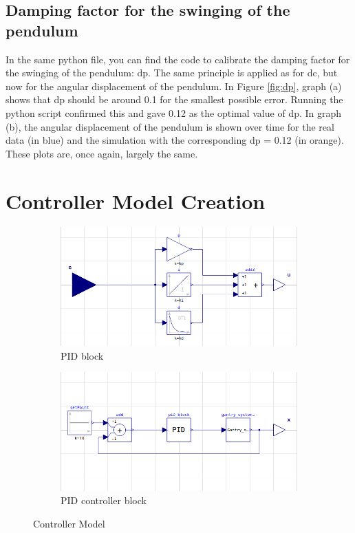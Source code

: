 \documentclass{article}
\begin{document}
\subsection{Damping factor for the swinging of the pendulum}

In the same python file, you can find the code to calibrate the damping factor for the swinging of the pendulum: dp. The same principle is applied as for dc, but now for the angular displacement of the pendulum. In Figure \ref{fig:dp}, graph (a) shows that dp should be around 0.1 for the smallest possible error. Running the python script confirmed this and gave 0.12 as the optimal value of dp. In graph (b), the angular displacement of the pendulum is shown over time for the real data (in blue) and the simulation with the corresponding dp = 0.12 (in orange). These plots are, once again, largely the same.

\section{Controller Model Creation}

\begin{figure}[h]
    \begin{subfigure}[b]{0.5\textwidth}
        \includegraphics[width=\linewidth]{graphs/PID_block.png}
        \caption{PID block}
    \end{subfigure}
    \begin{subfigure}[b]{0.5\textwidth}
        \includegraphics[width=\linewidth]{graphs/PID_controller_block.png}
        \caption{PID controller block}
    \end{subfigure}
    \caption{Controller Model}
    \label{fig:PID}
\end{figure}
\end{document}
